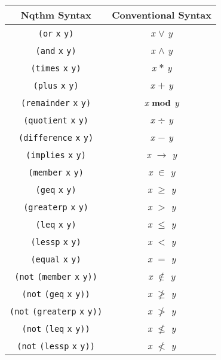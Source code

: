 \begin{tabular}{|c|c|}\hline
Nqthm Syntax &  Conventional Syntax \\ \hline \hline{\tt{(}}{\tt{or}} {\tt{x}} {\tt{y}}{\tt{)}}&{\it{x\/}} $\vee$ {\it{y\/}} \\  
{\tt{(}}{\tt{and}} {\tt{x}} {\tt{y}}{\tt{)}}&{\it{x\/}} $\wedge$ {\it{y\/}} \\  
{\tt{(}}{\tt{times}} {\tt{x}} {\tt{y}}{\tt{)}}&{\it{x\/}} $*$ {\it{y\/}} \\  
{\tt{(}}{\tt{plus}} {\tt{x}} {\tt{y}}{\tt{)}}&{\it{x\/}} $+$ {\it{y\/}} \\  
{\tt{(}}{\tt{remainder}} {\tt{x}} {\tt{y}}{\tt{)}}&{\it{x\/}} ${\rm\bf{mod}}$ {\it{y\/}} \\  
{\tt{(}}{\tt{quotient}} {\tt{x}} {\tt{y}}{\tt{)}}&{\it{x\/}} $\div$ {\it{y\/}} \\  
{\tt{(}}{\tt{difference}} {\tt{x}} {\tt{y}}{\tt{)}}&{\it{x\/}} $-$ {\it{y\/}} \\  
{\tt{(}}{\tt{implies}} {\tt{x}} {\tt{y}}{\tt{)}}&{\it{x\/}} $\rightarrow$ {\it{y\/}} \\  
{\tt{(}}{\tt{member}} {\tt{x}} {\tt{y}}{\tt{)}}&{\it{x\/}} $\in$ {\it{y\/}} \\  
{\tt{(}}{\tt{geq}} {\tt{x}} {\tt{y}}{\tt{)}}&{\it{x\/}} $\geq$ {\it{y\/}} \\  
{\tt{(}}{\tt{greaterp}} {\tt{x}} {\tt{y}}{\tt{)}}&{\it{x\/}} $>$ {\it{y\/}} \\  
{\tt{(}}{\tt{leq}} {\tt{x}} {\tt{y}}{\tt{)}}&{\it{x\/}} $\leq$ {\it{y\/}} \\  
{\tt{(}}{\tt{lessp}} {\tt{x}} {\tt{y}}{\tt{)}}&{\it{x\/}} $<$ {\it{y\/}} \\  
{\tt{(}}{\tt{equal}} {\tt{x}} {\tt{y}}{\tt{)}}&{\it{x\/}} $=$ {\it{y\/}} \\  
{\tt{(}}{\tt{not}} {\tt{(}}{\tt{member}} {\tt{x}} {\tt{y}}{\tt{)}}{\tt{)}}&{\it{x\/}} $\not\in$ {\it{y\/}} \\  
{\tt{(}}{\tt{not}} {\tt{(}}{\tt{geq}} {\tt{x}} {\tt{y}}{\tt{)}}{\tt{)}}&{\it{x\/}} $\not\geq$ {\it{y\/}} \\  
{\tt{(}}{\tt{not}} {\tt{(}}{\tt{greaterp}} {\tt{x}} {\tt{y}}{\tt{)}}{\tt{)}}&{\it{x\/}} $\not>$ {\it{y\/}} \\  
{\tt{(}}{\tt{not}} {\tt{(}}{\tt{leq}} {\tt{x}} {\tt{y}}{\tt{)}}{\tt{)}}&{\it{x\/}} $\not\leq$ {\it{y\/}} \\  
{\tt{(}}{\tt{not}} {\tt{(}}{\tt{lessp}} {\tt{x}} {\tt{y}}{\tt{)}}{\tt{)}}&{\it{x\/}} $\not<$ {\it{y\/}} \\  

\end{tabular}
